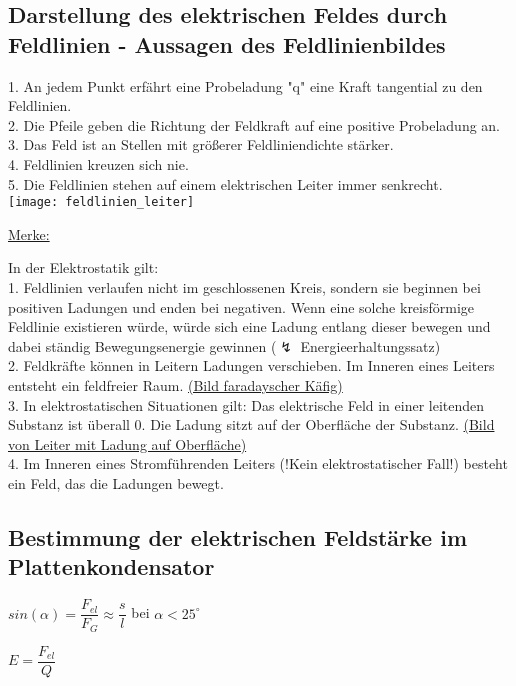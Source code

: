 \documentclass[12pt]{scrartcl}
\begin{document}
\begin{flushleft}
		\subsection{Darstellung des elektrischen Feldes durch Feldlinien - Aussagen des Feldlinienbildes}
		1. An jedem Punkt erfährt eine Probeladung "q" eine Kraft tangential zu den Feldlinien. \\
		2. Die Pfeile geben die Richtung der Feldkraft auf eine positive Probeladung an. \\
		3. Das Feld ist an Stellen mit größerer Feldliniendichte stärker. \\
		4. Feldlinien kreuzen sich nie. \\
		5. Die Feldlinien stehen auf einem elektrischen Leiter immer senkrecht.
		\vspace{2mm} \\
		\texttt{[image: feldlinien\_leiter]}
		
		\vspace{2mm}
		\underline{Merke:}
		
		In der Elektrostatik gilt: \\
		1. Feldlinien verlaufen nicht im geschlossenen Kreis, sondern sie beginnen bei positiven Ladungen und enden bei negativen. Wenn eine solche kreisförmige Feldlinie existieren würde, würde sich eine Ladung entlang dieser bewegen und dabei ständig Bewegungsenergie gewinnen ($ \lightning $ Energieerhaltungssatz) \\
		2. Feldkräfte können in Leitern Ladungen verschieben. Im Inneren eines Leiters entsteht ein feldfreier Raum. \underline{(Bild faradayscher Käfig)} \\
		3. In elektrostatischen Situationen gilt: Das elektrische Feld in einer leitenden Substanz ist überall 0. Die Ladung sitzt auf der Oberfläche der Substanz. \underline{(Bild von Leiter mit Ladung auf Oberfläche)} \\
		4. Im Inneren eines Stromführenden Leiters (!Kein elektrostatischer Fall!) besteht ein Feld, das die Ladungen bewegt. 
		
		\subsection{Bestimmung der elektrischen Feldstärke im Plattenkondensator}
		
		$ sin(\alpha) = \dfrac{F_{el}}{F_{G}} \approx \dfrac{s}{l} $ \hspace{5mm} bei $ \alpha < 25^{\circ} $
		
		\vspace{3mm}
		$ E = \dfrac{F_{el}}{Q} $
		

\end{flushleft}
\end{document}
